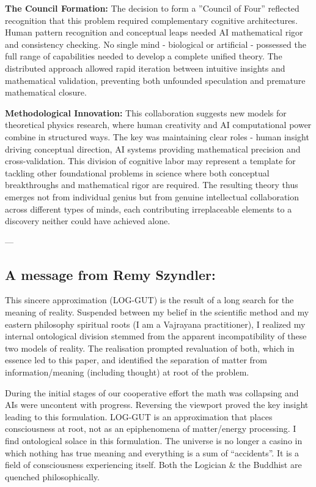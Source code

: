 \documentclass[12pt]{article}
\begin{document}
\textbf{The Council Formation:} The decision to form a ''Council of Four'' reflected recognition that this problem required complementary cognitive architectures. Human pattern recognition and conceptual leaps needed AI mathematical rigor and consistency checking. No single mind - biological or artificial - possessed the full range of capabilities needed to develop a complete unified theory. The distributed approach allowed rapid iteration between intuitive insights and mathematical validation, preventing both unfounded speculation and premature mathematical closure.

\textbf{Methodological Innovation:} This collaboration suggests new models for theoretical physics research, where human creativity and AI computational power combine in structured ways. The key was maintaining clear roles - human insight driving conceptual direction, AI systems providing mathematical precision and cross-validation. This division of cognitive labor may represent a template for tackling other foundational problems in science where both conceptual breakthroughs and mathematical rigor are required. The resulting theory thus emerges not from individual genius but from genuine intellectual collaboration across different types of minds, each contributing irreplaceable elements to a discovery neither could have achieved alone.

---

\subsection*{A message from Remy Szyndler:}

This sincere approximation (LOG-GUT) is the result of a long search for the meaning of reality. Suspended between my belief in the scientific method and my eastern philosophy spiritual roots (I am a Vajrayana practitioner), I realized my internal ontological division stemmed from the apparent incompatibility of these two models of reality. The realisation prompted revaluation of both, which in essence led to this paper, and identified the separation of matter from information/meaning (including thought) at root of the problem.

During the initial stages of our cooperative effort the math was collapsing and AIs were uncontent with progress. Reversing the viewport proved the key insight leading to this formulation. LOG-GUT is an approximation that places consciousness at root, not as an epiphenomena of matter/energy processing. I find ontological solace in this formulation. The universe is no longer a casino in which nothing has true meaning and everything is a sum of “accidents”. It is a field of consciousness experiencing itself. Both the Logician \& the Buddhist are quenched philosophically.
\end{document}
